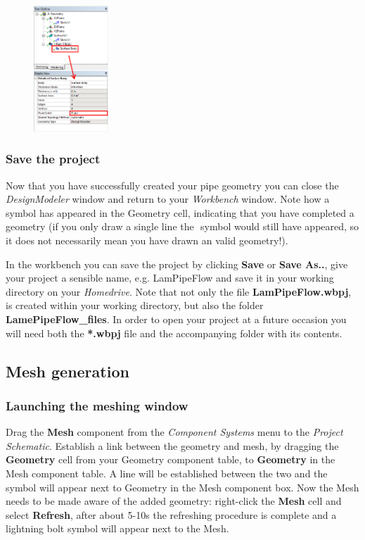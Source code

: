 \documentclass[11pt,a4paper,oneside,hidelinks]{scrartcl}
\newcommand\bfr[1]{\textcolor[rgb]{1,0.00,0.00}{\textbf{\textsf{#1}}}}
\newcommand\cm{\textcolor[rgb]{0.00,0.50,0.00}{\checkmark}\,\,}
\begin{document}
\begin{figure}[H]
\begin{center}
\includegraphics[width=0.25\textwidth,clip]{Fluid_domain.png}
\end{center}
\end{figure}

\subsubsection{Save the project}
Now that you have successfully created your pipe geometry you can close the \emph{DesignModeler} window and return to your \emph{Workbench} window. Note how a \cm  symbol has appeared in the Geometry cell, indicating that you have completed a geometry (if you only draw a single line the \cm  symbol would still have appeared, so it does not necessarily mean you have drawn an valid geometry!).

In the workbench you can save the project by clicking \bfr{Save} or \bfr{Save As..}, give your project a sensible name, e.g. LamPipeFlow and save it in your working directory on your \emph{Homedrive}. Note that not only the file \bfr{LamPipeFlow.wbpj}, is created within your working directory, but also the folder \bfr{LamePipeFlow\_files}. In order to open your project at a future occasion you will need both the \bfr{*.wbpj} file and the accompanying folder with its contents.

\subsection{Mesh generation}

\subsubsection{Launching the meshing window}

Drag the \bfr{Mesh} component from the \emph{Component Systems} menu to the \emph{Project Schematic}. Establish a link between the geometry and mesh, by dragging the \bfr{Geometry} cell from your Geometry component table, to \bfr{Geometry} in the Mesh component table. A line will be established between the two and the \cm symbol will appear next to Geometry in the Mesh component box. Now the Mesh needs to be made aware of the added geometry: right-click the \bfr{Mesh} cell and select \bfr{Refresh}, after about 5-10s the refreshing procedure is complete and a lightning bolt symbol will appear next to the Mesh.
\end{document}
